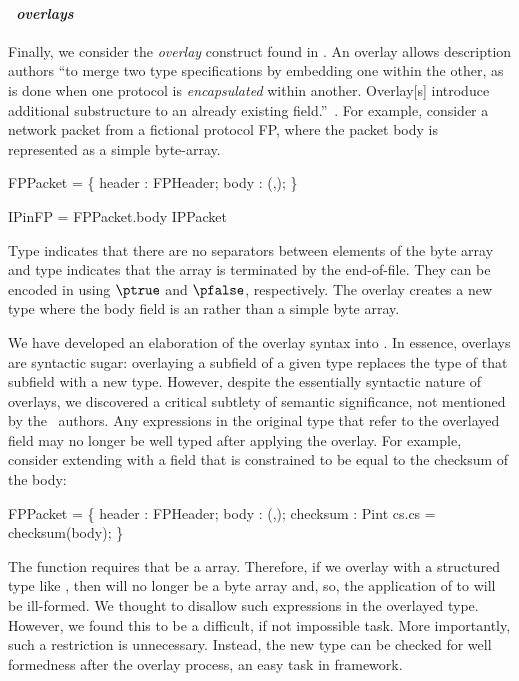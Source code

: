 \paragraph*{\em \packettypes\ overlays}
Finally, we consider the {\it overlay} construct found in
\packettypes{}.  An overlay allows description authors ``to merge two
type specifications by embedding one within the other, as is done when
one protocol is {\it encapsulated} within another. Overlay[s]
introduce additional substructure to an already existing
field.''~\cite{sigcomm00}.  For example, consider a network packet
from a fictional protocol FP, where the packet body is represented as
a simple byte-array.
\begin{code}
FPPacket = \Pstruct \{
  header : FPHeader;
  body   : \Pbyte \Parray{}(\Pnosep,\Peof);
\}

IPinFP = \Poverlay FPPacket.body \Pwith IPPacket
\end{code}
Type \Pnosep{} indicates that there are no separators between elements
of the byte array and type \Peof{} indicates that the array is
terminated by the end-of-file. They can be encoded in \ddc{} using
$\ptrue$ and $\pfalse$, respectively. The overlay creates a new type
 where the body field is an  rather than a
simple byte array.

We have developed an elaboration of the overlay syntax into \ddc{}. In
essence, overlays are syntactic sugar: overlaying a subfield of a
given type replaces the type of that subfield with a new type.
However, despite the essentially syntactic nature of overlays, we
discovered a critical subtlety of semantic significance, not mentioned
by the \packettypes\ authors. Any expressions in the original type that refer to the
overlayed field may no longer be well typed after applying the
overlay. For example, consider extending  with a field
that is constrained to be equal to the checksum of the body:
\begin{code}
FPPacket = \Pstruct \{
  header   : FPHeader;
  body     : \Pbyte \Parray{}(\Pnosep,\Peof);
  checksum : Pint \Pwhere{} cs.cs = checksum(body);
\}
\end{code}
\noindent
The  function requires that  be a 
array. Therefore, if we overlay  with a structured type like
, then  will no longer be a byte array and, so,
the application of  to  will be
ill-formed.  We thought to disallow such expressions in the overlayed
type. However, we found this to be a difficult, if not impossible
task.  More importantly, such a restriction is unnecessary.  Instead,
the new type can be checked for well formedness after the overlay
process, an easy task in \ddc{} framework.

